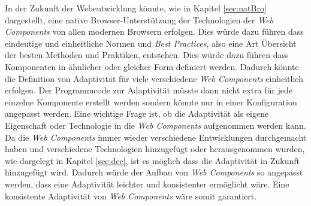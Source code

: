 \documentclass[12pt, paper=a4, bibtotoc, toc=listof, headsepline=true, numbers=endperiod]{scrreprt}
\begin{document}
\newline
In der Zukunft der Webentwicklung könnte, wie in Kapitel \ref{sec:natBro} dargestellt, eine native Browser-Unterstützung der Technologien der \emph{Web Components} von allen modernen Browsern erfolgen. Dies würde dazu führen dass eindeutige und einheitliche Normen und \emph{Best Practices}, also eine Art Übersicht der besten Methoden und Praktiken, entstehen. Dies würde dazu führen dass Komponenten in ähnlicher oder gleicher Form definiert werden. Dadurch könnte die Definition von Adaptivität für viele verschiedene \emph{Web Components} einheitlich erfolgen. Der Programmcode zur Adaptivität müsste dann nicht extra für jede einzelne Komponente erstellt werden sondern könnte nur in einer Konfiguration angepasst werden. Eine wichtige Frage ist, ob die Adaptivität als eigene Eigenschaft oder Technologie in die \emph{Web Components} aufgenommen werden kann. Da die \emph{Web Components} immer wieder verschiedene Entwicklungen durchgemacht haben und verschiedene Technologien hinzugefügt oder herausgenommen wurden, wie dargelegt in Kapitel \ref{sec:dec}, ist es möglich dass die Adaptivität in Zukunft hinzugefügt wird. Dadurch würde der Aufbau von \emph{Web Components} so angepasst werden, dass eine Adaptivität leichter und konsistenter ermöglicht wäre. Eine konsistente Adaptivität von \emph{Web Components} wäre somit garantiert.
\printbibliography
\end{document}
